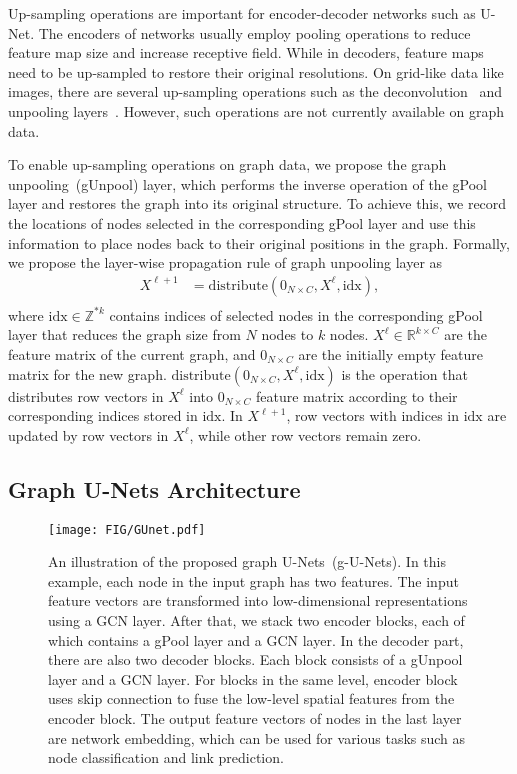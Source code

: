 \documentclass{article}
\begin{document}
Up-sampling operations are important for encoder-decoder networks
such as U-Net. The encoders of networks usually employ pooling
operations to reduce feature map size and increase receptive field.
While in decoders, feature maps need to be up-sampled to restore
their original resolutions. On grid-like data like images, there are
several up-sampling operations such as the
deconvolution~\citep{isola2017image,Zhao2015StackedWA} and
unpooling layers~\citep{long2015fully}.
However, such operations are not currently
available on graph data.

To enable up-sampling operations on graph data, we propose the graph
unpooling~(gUnpool) layer, which performs the inverse operation of
the gPool layer and restores the graph into its original structure.
To achieve this, we record the locations of nodes selected in the
corresponding gPool layer and use this information to place nodes
back to their original positions in the graph. Formally, we propose
the layer-wise propagation rule of graph unpooling layer as
\begin{equation}
\begin{aligned}
  X^{\ell+1} &= \mbox{distribute}(0_{N\times C}, X^{\ell}, \mbox{idx}), \\
\end{aligned}\label{eq:gunpool}
\end{equation}
where $\mbox{idx} \in \mathbb{Z}^{*k}$ contains indices of selected
nodes in the corresponding gPool layer that reduces the graph size
from $N$ nodes to $k$ nodes. $X^{\ell} \in \mathbb{R}^{k \times C}$
are the feature matrix of the current graph, and $0_{N\times C}$ are
the initially empty feature matrix for the new graph.
$\mbox{distribute}(0_{N\times C}, X^{\ell}, \mbox{idx})$ is the
operation that distributes row vectors in $X^{\ell}$ into
$0_{N\times C}$ feature matrix according to their corresponding
indices stored in $\mbox{idx}$. In $X^{\ell+1}$, row vectors with
indices in $\mbox{idx}$ are updated by row vectors in $X^{\ell}$,
while other row vectors remain zero.


\subsection{Graph U-Nets Architecture}\label{sec:gunet}

\begin{figure*}[t] \texttt{[image: FIG/GUnet.pdf]}
\caption{An illustration of the proposed graph U-Nets~(g-U-Nets). In
this example, each node in the input graph has two features. The
input feature vectors are transformed into low-dimensional
representations using a GCN layer. After that, we stack two encoder
blocks, each of which contains a gPool layer and a GCN layer. In the
decoder part, there are also two decoder blocks. Each block consists
of a gUnpool layer and a GCN layer. For blocks in the same level,
encoder block uses skip connection to fuse the low-level spatial
features from the encoder block. The output feature vectors of nodes
in the last layer are network embedding, which can be used for
various tasks such as node classification and link prediction. }
\label{fig:unet}
\end{figure*}
\end{document}
